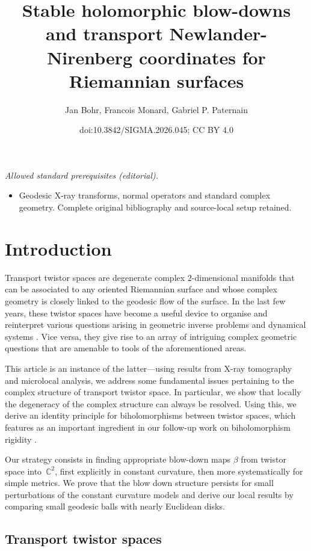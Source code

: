 \documentclass[10pt,a4paper]{amsart}
\title{Stable holomorphic blow-downs and transport Newlander-Nirenberg coordinates for Riemannian surfaces}
\author{Jan Bohr, Francois Monard, Gabriel P. Paternain}
\date{doi:10.3842/SIGMA.2026.045; CC BY 4.0}
\numberwithin{equation}{section}
\theoremstyle{definition}
\newcommand{\C}{\mathbb{C}} %
\newcommand{\1}{{\bf 1}}
\begin{document}
\maketitle
\noindent\textit{Allowed standard prerequisites (editorial).}\begin{itemize}
\item Geodesic X-ray transforms, normal operators and standard complex geometry. Complete original bibliography and source-local setup retained.
\end{itemize}\medskip
\section{Introduction}

Transport twistor spaces are degenerate complex $2$-dimensional manifolds that can be associated to any oriented Riemannian surface and whose complex geometry is closely linked to the geodesic flow of the surface.
In the last few years, these twistor spaces have become a useful device to organise and reinterpret various questions arising in geometric inverse problems and dynamical systems \cite{BLP24,BoPa23}.
Vice versa, they give rise to an array of intriguing complex geometric questions that are amenable to tools of the aforementioned areas.

This article is an instance of the latter---using results from X-ray tomography and microlocal analysis, we address some fundamental issues pertaining to the complex structure of transport twistor space. In particular, we
show that locally the degeneracy of the complex structure can always be resolved. Using this, we derive an identity principle for biholomorphisms between twistor spaces, which features as an important ingredient in our follow-up work on biholomorphism rigidity \cite{BMP24b}.

Our strategy consists in finding appropriate blow-down maps $\beta$ from twistor space into~$\C^2$, first explicitly in constant curvature, then more systematically for simple metrics. We prove that the blow down structure persists for small perturbations of the constant curvature models and derive our local results by comparing small geodesic balls with nearly Euclidean disks.


\subsection{Transport twistor spaces}
\end{document}
